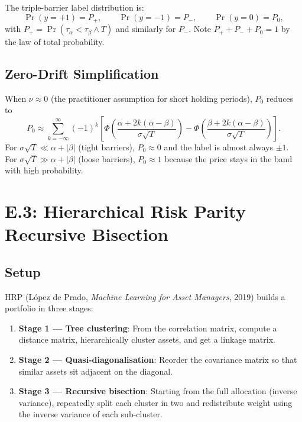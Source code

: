 The triple-barrier label distribution is:
\[
\Pr(y = +1) = P_+, \qquad \Pr(y = -1) = P_-, \qquad \Pr(y = 0) = P_0,
\]
with $P_+ = \Pr(\tau_\alpha < \tau_\beta \wedge T)$ and similarly for
$P_-$. Note $P_+ + P_- + P_0 = 1$ by the law of total probability.


\subsection{Zero-Drift Simplification}

When $\nu \approx 0$ (the practitioner assumption for short
holding periods), $P_0$ reduces to
\[
P_0 \approx \sum_{k=-\infty}^{\infty} (-1)^k \left[ \Phi\!\left(\frac{\alpha + 2 k (\alpha - \beta)}{\sigma \sqrt{T}}\right) - \Phi\!\left(\frac{\beta + 2 k (\alpha - \beta)}{\sigma \sqrt{T}}\right) \right].
\]
For $\sigma \sqrt{T} \ll \alpha + |\beta|$ (tight barriers), $P_0
\approx 0$ and the label is almost always $\pm 1$. For $\sigma \sqrt{T}
\gg \alpha + |\beta|$ (loose barriers), $P_0 \approx 1$ because the
price stays in the band with high probability.

\section{E.3: Hierarchical Risk Parity Recursive Bisection}

\subsection{Setup}

HRP (L\'opez de Prado, \emph{Machine Learning for Asset Managers},
2019) builds a portfolio in three stages:
\begin{enumerate}
    \item \textbf{Stage 1 --- Tree clustering}: From the correlation
          matrix, compute a distance matrix, hierarchically cluster
          assets, and get a linkage matrix.
    \item \textbf{Stage 2 --- Quasi-diagonalisation}: Reorder the
          covariance matrix so that similar assets sit adjacent on
          the diagonal.
    \item \textbf{Stage 3 --- Recursive bisection}: Starting from the
          full allocation (inverse variance), repeatedly split each
          cluster in two and redistribute weight using the inverse
          variance of each sub-cluster.
\end{enumerate}


